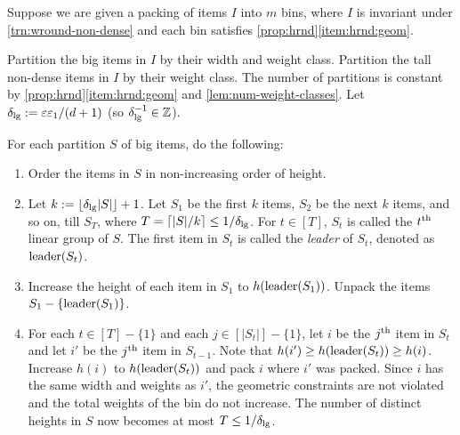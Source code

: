 \begin{transformation}
\label{trn:lingroup}
Suppose we are given a packing of items $I$ into $m$ bins,
where $I$ is invariant under \cref{trn:wround-non-dense} and
each bin satisfies \cref{prop:hrnd}\ref{item:hrnd:geom}.

Partition the big items in $I$ by their width and weight class.
Partition the tall non-dense items in $I$ by their weight class.
The number of partitions is constant by \cref{prop:hrnd}\ref{item:hrnd:geom}
and \cref{lem:num-weight-classes}.
Let $\delta_{\mathrm{lg}} := \varepsilon\varepsilon_1/(d+1)$ (so $\delta_{\mathrm{lg}}^{-1} \in \mathbb{Z}$).

For each partition $S$ of big items, do the following:
\begin{enumerate}
\item Order the items in $S$ in non-increasing order of height.
\item Let $k := \left\lfloor \delta_{\mathrm{lg}}|S| \right\rfloor+1$.
    Let $S_1$ be the first $k$ items, $S_2$ be the next $k$ items, and so on, till $S_T$,
    where $T = \left\lceil |S|/k \right\rceil \le 1/\delta_{\mathrm{lg}}$.
    For $t \in [T]$, $S_t$ is called the $t^{\textrm{th}}$ linear group of $S$.
    The first item in $S_t$ is called the \emph{leader} of $S_t$, denoted as $\operatorname{leader}(S_t)$.
\item Increase the height of each item in $S_1$ to $h(\operatorname{leader}(S_1))$.
    Unpack the items $S_1 - \{\operatorname{leader}(S_1)\}$.
\item For each $t \in [T] - \{1\}$ and each $j \in [|S_t|] - \{1\}$,
    let $i$ be the $j^{\textrm{th}}$ item in $S_t$ and let $i'$ be the $j^{\textrm{th}}$ item in $S_{t-1}$.
    Note that $h(i') \ge h(\operatorname{leader}(S_t)) \ge h(i)$.
    Increase $h(i)$ to $h(\operatorname{leader}(S_t))$ and pack $i$ where $i'$ was packed.
    Since $i$ has the same width and weights as $i'$,
    the geometric constraints are not violated
    and the total weights of the bin do not increase.
    The number of distinct heights in $S$ now becomes at most $T \le 1/\delta_{\mathrm{lg}}$.
\end{enumerate}


\end{transformation}
